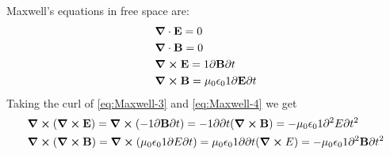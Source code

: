 \documentclass[english, a4paper, 12pt, twoside]{article}
\numberwithin{equation}{section} %
\begin{document}
Maxwell's equations in free space are:
\begin{subequations}
    \label{eq:optim}
    \begin{align}
        &\grad \cdot \textbf{E} = 0 \label{eq:Maxwell-1} \\
        &\grad \cdot \textbf{B} = 0 \label{eq:Maxwell-2}\\
        &\grad \cross \textbf{E} = 1{\partial\textbf{B}}{\partial t} \label{eq:Maxwell-3}\\
        &\grad \cross \textbf{B} = \mu_0 \epsilon_0 1{\partial\textbf{E}}{\partial t} \label{eq:Maxwell-4}
    \end{align}
\end{subequations}
Taking the curl of \ref{eq:Maxwell-3} and \ref{eq:Maxwell-4} we get
\begin{subequations} 
\label{eq:curl-}
    \begin{align}
        &\curl{(\curl{\textbf{E}})} 
        = \curl{(-1{\partial \textbf{B}}{\partial t})} 
        = -1{\partial}{\partial t}(\curl{\textbf{B}})
        = - \mu_0 \epsilon_0 1{\partial^2 E}{\partial t^2} 
        \label{eq:curl-E}\\
        &\curl{(\curl{\textbf{B}})} 
        = \curl{(\mu_0 \epsilon_0 1{\partial E}{\partial t})} 
        = \mu_0 \epsilon_01{\partial}{\partial t}(\curl{E}) 
        = - \mu_0 \epsilon_0 1{\partial^2 \textbf{B}}{\partial t^2} 
        \label{eq:curl-B}
    \end{align}
\end{subequations}
   
\end{document}
